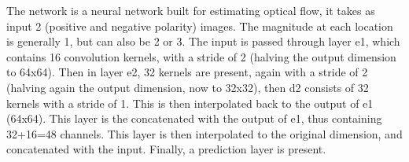 The network is a neural network built for estimating optical flow, it takes as input 2 (positive and negative polarity) images. The magnitude at each location is generally 1, but can also be 2 or 3. The input is passed through layer e1, which contains 16 convolution kernels, with a stride of 2 (halving the output dimension to 64x64). Then in layer e2, 32 kernels are present, again with a stride of 2 (halving again the output dimension, now to 32x32), then d2 consists of 32 kernels with a stride of 1. This is then interpolated back to the output of e1 (64x64). This layer is the concatenated with the output of e1, thus containing 32+16=48 channels. This layer is then interpolated to the original dimension, and concatenated with the input. Finally, a prediction layer is present. 